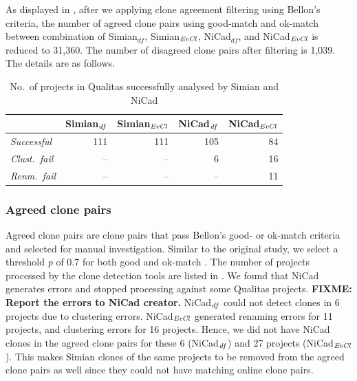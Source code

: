 \documentclass{sig-alternate-05-2015}
\newcommand\FIXME[1]{\textbf{FIXME: #1}}
\begin{document}
As displayed in , after we applying clone agreement filtering using Bellon's criteria, the number of agreed clone pairs using good-match and ok-match between combination of Simian$_{df}$, Simian$_{\textrm{\textit{EvCl}}}$, NiCad$_{df}$, and NiCad$_{\textrm{\textit{EvCl}}}$ is reduced to 31,360. The number of disagreed clone pairs after filtering is 1,039. The details are as follows.

\begin{table}
	\centering
	\caption{No.~of projects in Qualitas successfully analysed by Simian and NiCad}
	\label{tab:projects_missing}
	\small
	\begin{tabular}{l|r|r|r|r}
		\hline
		& Simian$_{\textrm{\textit{df}}}$ & Simian$_{\textrm{\textit{EvCl}}}$  & NiCad$_{\textrm{\textit{df}}}$ & NiCad$_{\textrm{\textit{EvCl}}}$ \\ 
		\hline
		\textit{Successful} & 111 & 111 & 105 & 84 \\ 
		\textit{Clust.~fail} & -- & -- & 6 & 16 \\
		\textit{Renm.~fail} & -- &  -- & -- & 11 \\
		\hline
	\end{tabular}
\end{table}

\subsubsection{Agreed clone pairs}

Agreed clone pairs are clone pairs that pass Bellon's good- or ok-match criteria and selected for manual investigation.  Similar to the original study, we select a threshold \textit{p} of 0.7 for both good and ok-match \cite{Bellon2007}. The number of projects processed by the clone detection tools are listed in . We found that NiCad generates errors and stopped processing against some Qualitas projects. \FIXME{Report the errors to NiCad creator.}  NiCad$_{\textrm{\textit{df}}}$ could not detect clones in 6 projects due to clustering errors. NiCad$_{\textrm{\textit{EvCl}}}$ generated renaming errors for 11 projects, and clustering errors for 16 projects. Hence, we did not have NiCad clones in the agreed clone pairs for these 6 (NiCad$_{\textrm{\textit{df}}}$) and 27 projects (NiCad$_{\textrm{\textit{EvCl}}}$). This makes Simian clones of the same projects to be removed from the agreed clone pairs as well since they could not have matching online clone pairs.
\end{document}
